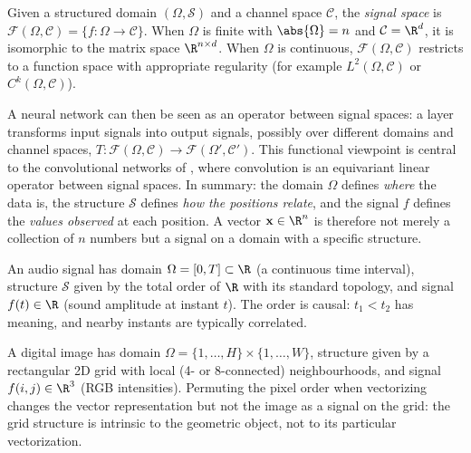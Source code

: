 \begin{definition}
\label{def:found:signal-space}
Given a structured domain $(\Omega, \mathcal{S})$ and a channel space
$\mathcal{C}$, the \emph{signal space} is
$\mathcal{F}(\Omega, \mathcal{C}) = \{f : \Omega \to \mathcal{C}\}$. When
$\Omega$ is finite with $\abs{\Omega} = n$ and $\mathcal{C} = \R^d$, it is
isomorphic to the matrix space $\R^{n \times d}$. When $\Omega$ is continuous,
$\mathcal{F}(\Omega, \mathcal{C})$ restricts to a function space with appropriate
regularity (for example $L^2(\Omega, \mathcal{C})$ or
$C^k(\Omega, \mathcal{C})$).
\end{definition}

A neural network can then be seen as an operator between signal spaces: a layer
transforms input signals into output signals, possibly over different domains
and channel spaces, $T : \mathcal{F}(\Omega, \mathcal{C}) \to
\mathcal{F}(\Omega', \mathcal{C}')$. This functional viewpoint is central to the
convolutional networks of , where convolution is an equivariant
linear operator between signal spaces. In summary: the domain $\Omega$ defines
\emph{where} the data is, the structure $\mathcal{S}$ defines \emph{how the
positions relate}, and the signal $f$ defines the \emph{values observed} at each
position. A vector $\mathbf{x} \in \R^n$ is therefore not merely a collection of
$n$ numbers but a signal on a domain with a specific structure.

\begin{example}
\label{ex:found:audio}
An audio signal has domain $\Omega = [0,T] \subset \R$ (a continuous time
interval), structure $\mathcal{S}$ given by the total order of $\R$ with its
standard topology, and signal $f(t) \in \R$ (sound amplitude at instant $t$).
The order is causal: $t_1 < t_2$ has meaning, and nearby instants are typically
correlated.
\end{example}

\begin{example}
\label{ex:found:image}
A digital image has domain $\Omega = \{1,\ldots,H\} \times \{1,\ldots,W\}$,
structure given by a rectangular 2D grid with local (4- or 8-connected)
neighbourhoods, and signal $f(i,j) \in \R^3$ (RGB intensities). Permuting the
pixel order when vectorizing changes the vector representation but not the image
as a signal on the grid: the grid structure is intrinsic to the geometric
object, not to its particular vectorization.
\end{example}

